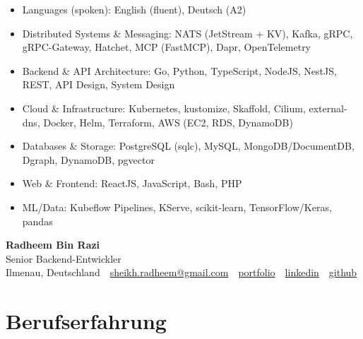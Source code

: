 \documentclass[10pt,a4paper]{resume}
\makeatletter
\newcommand{\Portfolio}{https://radheem.github.io/my-cv}
\newcommand{\PortfolioText}{portfolio}
\newcommand{\GitHub}{https://github.com/radheem}
\newcommand{\LinkedIn}{https://www.linkedin.com/in/radheem-razi}
\newcommand{\Email}{sheikh.radheem@gmail.com}
\makeatother
\begin{document}
\begin{itemize}[leftmargin=1.4em,nosep,topsep=2pt]
  \item Languages (spoken): English (fluent), Deutsch (A2)
  \item Distributed Systems \& Messaging: NATS (JetStream + KV), Kafka, gRPC, gRPC-Gateway, Hatchet, MCP (FastMCP), Dapr, OpenTelemetry
  \item Backend \& API Architecture: Go, Python, TypeScript, NodeJS, NestJS, REST, API Design, System Design
  \item Cloud \& Infrastructure: Kubernetes, kustomize, Skaffold, Cilium, external-dns, Docker, Helm, Terraform, AWS (EC2, RDS, DynamoDB)
  \item Databases \& Storage: PostgreSQL (sqlc), MySQL, MongoDB/DocumentDB, Dgraph, DynamoDB, pgvector
  \item Web \& Frontend: ReactJS, JavaScript, Bash, PHP
  \item ML/Data: Kubeflow Pipelines, KServe, scikit-learn, TensorFlow/Keras, pandas
\end{itemize}

\clearpage
{}

\begin{center}
  {\huge\bfseries Radheem Bin Razi}\\[3pt]
  {\large Senior Backend-Entwickler}\\[6pt]
  \small
  Ilmenau, Deutschland \,\textbar\,
  \href{mailto:\Email}{\Email} \,\textbar\,
  \href{\Portfolio}{\PortfolioText} \,\textbar\,
  \href{\LinkedIn}{linkedin} \,\textbar\,
  \href{\GitHub}{github}
\end{center}
\vspace{2pt}

\section{Berufserfahrung}
\end{document}
